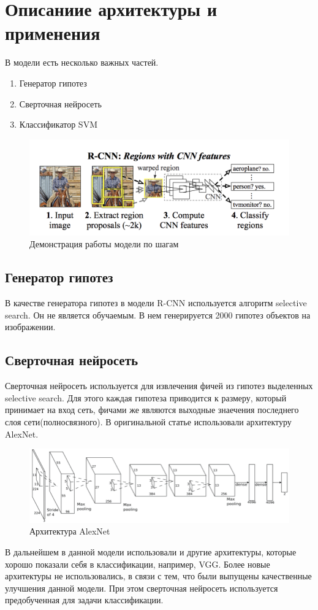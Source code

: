 \documentclass{article}
\begin{document}
	\section{Описаниие архитектуры и применения}
	В модели есть несколько важных частей.
	\begin{enumerate}
	    \item Генератор гипотез
	    \item Сверточная нейросеть
	    \item Классификатор SVM
	\end{enumerate}
	\begin{figure}[H]
	    \begin{center}
        \includegraphics[width=0.8\linewidth]{Image1.png}
        \caption{Демонстрация работы модели по шагам}
        \end{center}
    \end{figure}
    \subsection{Генератор гипотез}
	В качестве генератора гипотез в модели R-CNN используется алгоритм selective search. Он не является обучаемым. В нем генерируется 2000 гипотез объектов на изображении.
	\subsection{Сверточная нейросеть}
	Сверточная нейросеть используется для извлечения фичей из гипотез выделенных selective search. Для этого каждая гипотеза приводится к размеру, который принимает на вход сеть, фичами же являются выходные знаечения последнего слоя сети(полносвязного). В оригинальной статье использовали архитектуру AlexNet. 
	\begin{figure}[H]
	    \begin{center}
        \includegraphics[width=0.8\linewidth]{AlexNet.png}
        \caption{Архитектура AlexNet}
        \end{center}
    \end{figure}
    В дальнейшем в данной модели использовали и другие архитектуры, которые хорошо показали себя в классификации, например, VGG. Более новые архитектуры не использовались, в связи с тем, что были выпущены качественные улучшения данной модели. При этом сверточная нейросеть используется предобученная для задачи классификации.
\end{document}
